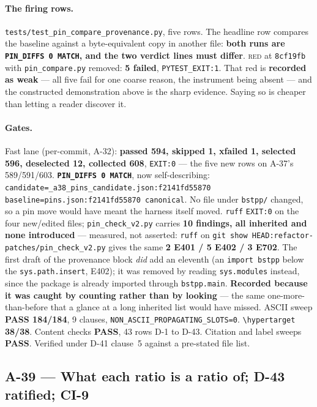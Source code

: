 \documentclass[
  10pt,
]{article}
\begin{document}
\paragraph{The firing rows.}
\texttt{tests/\allowbreak{}test\_pin\_compare\_provenance.py}, five rows. The headline row compares the baseline against a byte-equivalent copy in another file: \textbf{both runs are \texttt{PIN\_DIFFS 0 MATCH}, and the two verdict lines must differ}. \textsc{red} at \texttt{8cf19fb} with \texttt{pin\_compare.py} removed: \textbf{5 failed}, \texttt{PYTEST\_EXIT:1}. That red is \textbf{recorded as weak} --- all five fail for one coarse reason, the instrument being absent --- and the constructed demonstration above is the sharp evidence. Saying so is cheaper than letting a reader discover it.

\paragraph{Gates.}
Fast lane (per-commit, A-32): \textbf{passed 594, skipped 1, xfailed 1, selected 596, deselected 12, collected 608}, \texttt{EXIT:0} --- the five new rows on A-37's 589/591/603. \textbf{\texttt{PIN\_DIFFS 0 MATCH}}, now self-describing: \texttt{candidate=\allowbreak{}\_a38\_pins\_candidate.json:\allowbreak{}f2141fd55870 baseline=\allowbreak{}pins.json:\allowbreak{}f2141fd55870 canonical}. No file under \texttt{bstpp/} changed, so a pin move would have meant the harness itself moved. \texttt{ruff} \texttt{EXIT:0} on the four new/edited files; \texttt{pin\_check\_v2.py} carries \textbf{10 findings, all inherited and none introduced} --- measured, not asserted: \texttt{ruff} on \texttt{git show HEAD:refactor-patches/\allowbreak{}pin\_check\_v2.py} gives the same \textbf{2 E401 / 5 E402 / 3 E702}. The first draft of the provenance block \emph{did} add an eleventh (an \texttt{import bstpp} below the \texttt{sys.path.insert}, E402); it was removed by reading \texttt{sys.modules} instead, since the package is already imported through \texttt{bstpp.main}. \textbf{Recorded because it was caught by counting rather than by looking} --- the same one-more-than-before that a glance at a long inherited list would have missed. ASCII sweep \textbf{PASS 184/184}, 9 clauses, \texttt{NON\_ASCII\_PROPAGATING\_SLOTS=0}. \texttt{\textbackslash hypertarget} \textbf{38/38}. Content checks \textbf{PASS}, 43 rows D-1 to D-43. Citation and label sweeps \textbf{PASS}. Verified under D-41 clause~5 against a pre-stated file list.

\hypertarget{a-39}{%
\subsection{A-39 --- What each ratio is a ratio of; D-43 ratified; CI-9}\label{a-39}}
\end{document}
